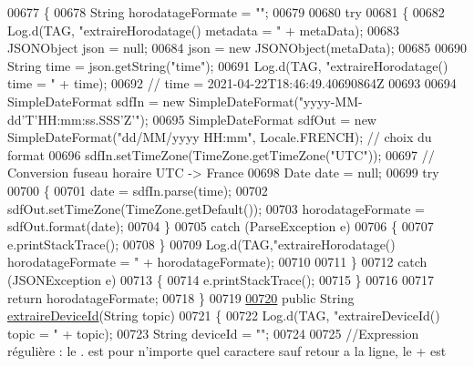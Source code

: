 \begin{DoxyCode}
{{{00677     \{
00678         String horodatageFormate = \textcolor{stringliteral}{""};
00679 
00680         \textcolor{keywordflow}{try}
00681         \{
00682             Log.d(TAG, \textcolor{stringliteral}{"extraireHorodatage() metadata = "} + metaData);
00683             JSONObject json = null;
00684             json = \textcolor{keyword}{new} JSONObject(metaData);
00685 
00690             String time = json.getString(\textcolor{stringliteral}{"time"});
00691             Log.d(TAG, \textcolor{stringliteral}{"extraireHorodatage() time = "} + time);
00692             \textcolor{comment}{// time = 2021-04-22T18:46:49.40690864Z}
00693 
00694             SimpleDateFormat sdfIn = \textcolor{keyword}{new} SimpleDateFormat(\textcolor{stringliteral}{"yyyy-MM-dd'T'HH:mm:ss.SSS'Z'"});
00695             SimpleDateFormat sdfOut = \textcolor{keyword}{new} SimpleDateFormat(\textcolor{stringliteral}{"dd/MM/yyyy HH:mm"}, Locale.FRENCH); \textcolor{comment}{// choix du
       format}
00696             sdfIn.setTimeZone(TimeZone.getTimeZone(\textcolor{stringliteral}{"UTC"}));
00697             \textcolor{comment}{// Conversion fuseau horaire UTC -> France}
00698             Date date = null;
00699             \textcolor{keywordflow}{try}
00700             \{
00701                 date = sdfIn.parse(time);
00702                 sdfOut.setTimeZone(TimeZone.getDefault());
00703                 horodatageFormate = sdfOut.format(date);
00704             \}
00705             \textcolor{keywordflow}{catch} (ParseException e)
00706             \{
00707                 e.printStackTrace();
00708             \}
00709             Log.d(TAG,\textcolor{stringliteral}{"extraireHorodatage() horodatageFormate = "} + horodatageFormate);
00710 
00711         \}
00712         \textcolor{keywordflow}{catch} (JSONException e)
00713         \{
00714             e.printStackTrace();
00715         \}
00716 
00717         \textcolor{keywordflow}{return} horodatageFormate;
00718     \}
00719 
\hyperlink{classcom_1_1example_1_1bee__honeyt_1_1_i_h_m_mobile_ab957cc8fd25c104c48341f7e4141e173}{00720}     \textcolor{keyword}{public} String \hyperlink{classcom_1_1example_1_1bee__honeyt_1_1_i_h_m_mobile_ab957cc8fd25c104c48341f7e4141e173}{extraireDeviceId}(String topic)
00721     \{
00722         Log.d(TAG, \textcolor{stringliteral}{"extraireDeviceId() topic = "} + topic);
00723         String deviceId = \textcolor{stringliteral}{""};
00724 
00725         \textcolor{comment}{//Expression régulière : le . est pour n'importe quel caractere sauf retour a la ligne, le + est
}}}}
\end{DoxyCode}

